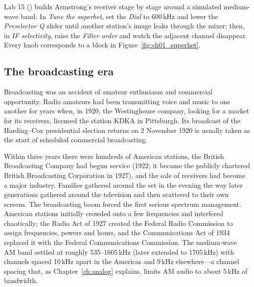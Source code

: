 \begin{tryit}
Lab 15 () builds Armstrong's receiver stage by stage around a
simulated medium-wave band. In \emph{Tune the superhet}, set the \emph{Dial} to 600\,kHz and lower the
\emph{Preselector Q} slider until another station's image leaks through the mixer; then, in \emph{IF
selectivity}, raise the \emph{Filter order} and watch the adjacent channel disappear. Every knob
corresponds to a block in Figure~\ref{fig:ch01_superhet}.
\end{tryit}


\subsection{The broadcasting era}

Broadcasting was an accident of amateur enthusiasm and commercial opportunity. Radio amateurs had been
transmitting voice and music to one another for years when, in 1920, the Westinghouse company, looking
for a market for its receivers, licensed the station KDKA in Pittsburgh. Its broadcast of the
Harding--Cox presidential election returns on 2 November 1920 is usually taken as the start of
scheduled commercial broadcasting.

Within three years there were hundreds of American stations, the British Broadcasting Company had
begun service (1922; it became the publicly chartered British Broadcasting Corporation in 1927), and
the sale of receivers had become a major industry. Families gathered around the set in the evening the
way later generations gathered around the television and then scattered to their own screens. The
broadcasting boom forced the first serious spectrum management. American stations initially crowded
onto a few frequencies and interfered chaotically; the Radio Act of 1927 created the Federal Radio
Commission to assign frequencies, powers and hours, and the Communications Act of 1934 replaced it
with the Federal Communications Commission. The medium-wave AM band settled at roughly
535--1605\,kHz (later extended to 1705\,kHz) with channels spaced 10\,kHz apart in the Americas and
9\,kHz elsewhere---a channel spacing that, as Chapter~\ref{ch:analog} explains, limits AM audio to
about 5\,kHz of bandwidth.

